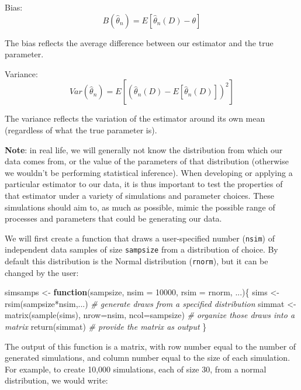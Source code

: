 \documentclass[
]{book}
\newenvironment{Shaded}{\begin{snugshade}}{\end{snugshade}}
\newcommand{\AttributeTok}[1]{\textcolor[rgb]{0.77,0.63,0.00}{#1}}
\newcommand{\CommentTok}[1]{\textcolor[rgb]{0.56,0.35,0.01}{\textit{#1}}}
\newcommand{\ControlFlowTok}[1]{\textcolor[rgb]{0.13,0.29,0.53}{\textbf{#1}}}
\newcommand{\DecValTok}[1]{\textcolor[rgb]{0.00,0.00,0.81}{#1}}
\newcommand{\FunctionTok}[1]{\textcolor[rgb]{0.00,0.00,0.00}{#1}}
\newcommand{\NormalTok}[1]{#1}
\newcommand{\OtherTok}[1]{\textcolor[rgb]{0.56,0.35,0.01}{#1}}
\newcommand{\SpecialCharTok}[1]{\textcolor[rgb]{0.00,0.00,0.00}{#1}}
\begin{document}
Bias: \[B(\hat\theta_n) =  E[\hat\theta_n(D) - \theta] \]

The bias reflects the average difference between our estimator and the true parameter.

Variance: \[Var(\hat\theta_n) =  E[ (\hat\theta_n(D) - E[\hat\theta_n(D)] )^2] \]

The variance reflects the variation of the estimator around its own mean (regardless of what the true parameter is).

\textbf{Note}: in real life, we will generally not know the distribution from which our data comes from, or the value of the parameters of that distribution (otherwise we wouldn't be performing statistical inference). When developing or applying a particular estimator to our data, it is thus important to test the properties of that estimator under a variety of simulations and parameter choices. These simulations should aim to, as much as possible, mimic the possible range of processes and parameters that could be generating our data.

We will first create a function that draws a user-specified number (\texttt{nsim}) of independent data samples of size \texttt{sampsize} from a distribution of choice. By default this distribution is the Normal distribution (\texttt{rnorm}), but it can be changed by the user:

\begin{Shaded}
\begin{Highlighting}[]
\NormalTok{simsamps }\OtherTok{\textless{}{-}} \ControlFlowTok{function}\NormalTok{(sampsize, }\AttributeTok{nsim =} \DecValTok{10000}\NormalTok{, }\AttributeTok{rsim =}\NormalTok{ rnorm, ...)\{}
\NormalTok{  sims }\OtherTok{\textless{}{-}} \FunctionTok{rsim}\NormalTok{(sampsize}\SpecialCharTok{*}\NormalTok{nsim,...) }\CommentTok{\# generate draws from a specified distribution}
\NormalTok{  simmat }\OtherTok{\textless{}{-}} \FunctionTok{matrix}\NormalTok{(}\FunctionTok{sample}\NormalTok{(sims), }\AttributeTok{nrow=}\NormalTok{nsim, }\AttributeTok{ncol=}\NormalTok{sampsize) }\CommentTok{\# organize those draws into a matrix}
  \FunctionTok{return}\NormalTok{(simmat) }\CommentTok{\# provide the matrix as output}
\NormalTok{\}}
\end{Highlighting}
\end{Shaded}

The output of this function is a matrix, with row number equal to the number of generated simulations, and column number equal to the size of each simulation. For example, to create 10,000 simulations, each of size 30, from a normal distribution, we would write:
\end{document}
